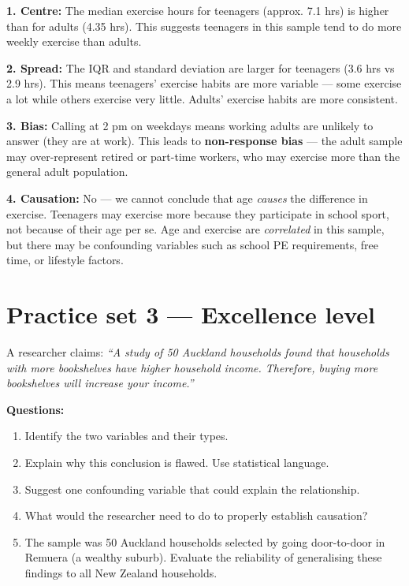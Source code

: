 \documentclass[
  11pt,
  a4paper,
  oneside,
  open=any]{scrbook}
\providecommand{\tightlist}{%
  \setlength{\itemsep}{0pt}\setlength{\parskip}{0pt}}
\begin{document}
\begin{tcolorbox}[enhanced jigsaw, breakable, leftrule=.75mm, bottomtitle=1mm, bottomrule=.15mm, titlerule=0mm, left=2mm, opacitybacktitle=0.6, coltitle=black, colbacktitle=quarto-callout-note-color!10!white, rightrule=.15mm, title=\textcolor{quarto-callout-note-color}{\faInfo}\hspace{0.5em}{Model answers}, toptitle=1mm, arc=.35mm, colback=white, toprule=.15mm, colframe=quarto-callout-note-color-frame, opacityback=0]

\textbf{1. Centre:} The median exercise hours for teenagers (approx. 7.1
hrs) is higher than for adults (4.35 hrs). This suggests teenagers in
this sample tend to do more weekly exercise than adults.

\textbf{2. Spread:} The IQR and standard deviation are larger for
teenagers (3.6 hrs vs 2.9 hrs). This means teenagers' exercise habits
are more variable --- some exercise a lot while others exercise very
little. Adults' exercise habits are more consistent.

\textbf{3. Bias:} Calling at 2 pm on weekdays means working adults are
unlikely to answer (they are at work). This leads to
\textbf{non-response bias} --- the adult sample may over-represent
retired or part-time workers, who may exercise more than the general
adult population.

\textbf{4. Causation:} No --- we cannot conclude that age \emph{causes}
the difference in exercise. Teenagers may exercise more because they
participate in school sport, not because of their age per se. Age and
exercise are \emph{correlated} in this sample, but there may be
confounding variables such as school PE requirements, free time, or
lifestyle factors.

\end{tcolorbox}

\section{Practice set 3 --- Excellence
level}\label{practice-set-3-excellence-level}

A researcher claims: \emph{``A study of 50 Auckland households found
that households with more bookshelves have higher household income.
Therefore, buying more bookshelves will increase your income.''}

\textbf{Questions:}

\begin{enumerate}
\def\labelenumi{\arabic{enumi}.}
\tightlist
\item
  Identify the two variables and their types.
\item
  Explain why this conclusion is flawed. Use statistical language.
\item
  Suggest one confounding variable that could explain the relationship.
\item
  What would the researcher need to do to properly establish causation?
\item
  The sample was 50 Auckland households selected by going door-to-door
  in Remuera (a wealthy suburb). Evaluate the reliability of
  generalising these findings to all New Zealand households.
\end{enumerate}
\end{document}
